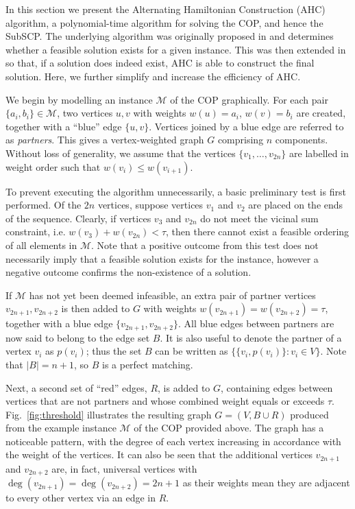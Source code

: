 \documentclass[a4paper,11pt,authoryear]{elsarticle}
\begin{document}
In this section we present the Alternating Hamiltonian Construction (AHC) algorithm, a polynomial-time algorithm for solving the COP, and hence the SubSCP. The underlying algorithm was originally proposed in \cite{becker2010} and determines whether a feasible solution exists for a given instance. This was then extended in \cite{hawa2018} so that, if a solution does indeed exist, AHC is able to construct the final solution. Here, we further simplify and increase the efficiency of AHC.

We begin by modelling an instance $\mathcal{M}$ of the COP graphically. For each pair $\{a_i, b_i\} \in \mathcal{M}$, two vertices $u, v$ with weights $w(u) = a_i$, $w(v) = b_i$ are created, together with a ``blue'' edge $\{u, v\}$. Vertices joined by a blue edge are referred to as \textit{partners}. This gives a vertex-weighted graph $G$ comprising $n$ components. Without loss of generality, we assume that the vertices $\{v_1,\dotsc,v_{2n}\}$ are labelled in weight order such that $w(v_i) \leq w(v_{i+1})$.

To prevent executing the algorithm unnecessarily, a basic preliminary test is first performed. Of the $2n$ vertices, suppose vertices $v_1$ and $v_2$ are placed on the ends of the sequence. Clearly, if vertices $v_3$ and $v_{2n}$ do not meet the vicinal sum constraint, i.e. $w(v_3) + w(v_{2n}) < \tau$, then there cannot exist a feasible ordering of all elements in $\mathcal{M}$. Note that a positive outcome from this test does not necessarily imply that a feasible solution exists for the instance, however a negative outcome confirms the non-existence of a solution.

If $\mathcal{M}$ has not yet been deemed infeasible, an extra pair of partner vertices $v_{2n+1}, v_{2n+2}$ is then added to $G$ with weights $w(v_{2n+1}) = w(v_{2n+2}) = \tau$, together with a blue edge $\{v_{2n+1}, v_{2n+2}\}$. All blue edges between partners are now said to belong to the edge set $B$. It is also useful to denote the partner of a vertex $v_i$ as $p(v_i)$; thus the set $B$ can be written as $\{\{v_i, p(v_i)\} : v_i \in V\}$. Note that $|B| = n+1$, so $B$ is a perfect matching. 

Next, a second set of ``red'' edges, $R$, is added to $G$, containing edges between vertices that are not partners and whose combined weight equals or exceeds $\tau$. Fig.~\ref{fig:threshold} illustrates the resulting graph $G = (V, B \cup R)$ produced from the example instance $\mathcal{M}$ of the COP provided above. The graph has a noticeable pattern, with the degree of each vertex increasing in accordance with the weight of the vertices. It can also be seen that the additional vertices $v_{2n+1}$ and $v_{2n+2}$ are, in fact, universal vertices with $\deg(v_{2n+1}) = \deg(v_{2n+2}) = 2n+1$ as their weights mean they are adjacent to every other vertex via an edge in $R$.
\end{document}
